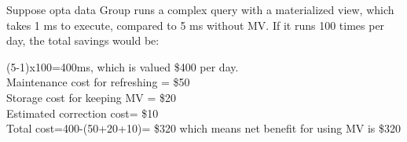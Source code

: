 \begin{enumerate}[label=\alph*)]
    

  Suppose opta data Group runs a complex query with a materialized view, which takes 1 ms to execute, compared to 5 ms without MV. If it runs 100 times per day, the total savings would be:
  
  (5-1)x100=400ms, which is valued \$400 per day.\\
   Maintenance cost for refreshing = \$50 \\
   Storage cost for keeping MV = \$20\\
   Estimated correction cost= \$10 \\
   Total cost={400-(50+20+10)}= \$320 which means net benefit for using MV is \$320

 
  
\end{enumerate}




